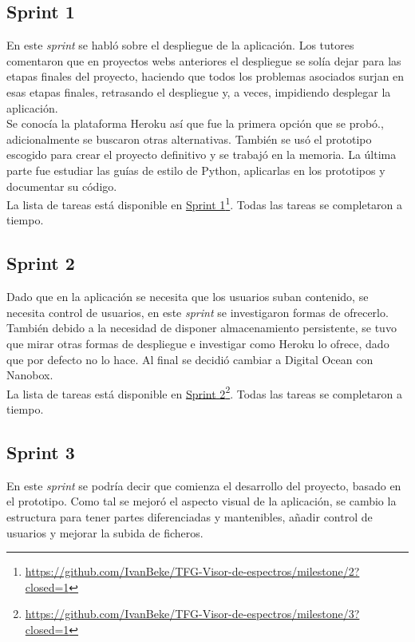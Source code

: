 \subsection{Sprint 1}
En este \textit{sprint} se habló sobre el despliegue de la aplicación. Los
tutores comentaron que en proyectos webs anteriores el despliegue se solía dejar
para las etapas finales del proyecto, haciendo que todos los problemas asociados
surjan en esas etapas finales, retrasando el despliegue y, a veces, impidiendo
desplegar la aplicación.\\

Se conocía la plataforma Heroku así que fue la primera opción que se probó., 
adicionalmente se buscaron otras alternativas. También se usó el prototipo 
escogido para crear el proyecto definitivo y se trabajó en la memoria. La 
última parte fue estudiar las guías de estilo de Python, aplicarlas en los 
prototipos y documentar su código.\\

La lista de tareas está disponible en
\href{https://github.com/IvanBeke/TFG-Visor-de-espectros/milestone/2?closed=1}{Sprint
	1}\footnote{\url{https://github.com/IvanBeke/TFG-Visor-de-espectros/milestone/2?closed=1}}.
Todas las tareas se completaron a tiempo.\\

\subsection{Sprint 2}
Dado que en la aplicación se necesita que los usuarios suban contenido, se
necesita control de usuarios, en este \textit{sprint} se investigaron formas de
ofrecerlo. También debido a la necesidad de disponer almacenamiento persistente,
se tuvo que mirar otras formas de despliegue e investigar como Heroku lo 
ofrece, dado que por defecto no lo hace. Al final se decidió cambiar a 
Digital Ocean con Nanobox.\\

La lista de tareas está disponible en
\href{https://github.com/IvanBeke/TFG-Visor-de-espectros/milestone/3?closed=1}{Sprint
	2}\footnote{\url{https://github.com/IvanBeke/TFG-Visor-de-espectros/milestone/3?closed=1}}.
Todas las tareas se completaron a tiempo.\\

\subsection{Sprint 3}
En este \textit{sprint} se podría decir que comienza el desarrollo del proyecto,
basado en el prototipo. Como tal se mejoró el aspecto visual de la aplicación,
se cambio la estructura para tener partes diferenciadas y mantenibles, añadir
control de usuarios y mejorar la subida de ficheros.\\


